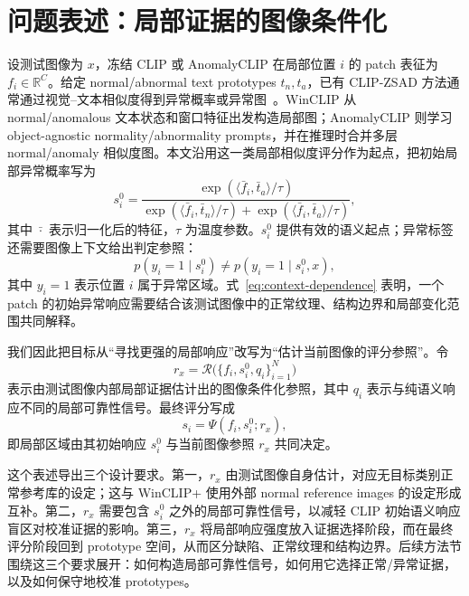 \section{问题表述：局部证据的图像条件化}

设测试图像为 $x$，冻结 CLIP 或 AnomalyCLIP 在局部位置 $i$ 的 patch 表征为 $f_i\in\mathbb{R}^{C}$。给定 normal/abnormal text prototypes $t_n,t_a$，已有 CLIP-ZSAD 方法通常通过视觉--文本相似度得到异常概率或异常图~\cite{jeong2023winclip,zhou2024anomalyclip}。WinCLIP 从 normal/anomalous 文本状态和窗口特征出发构造局部图；AnomalyCLIP 则学习 object-agnostic normality/abnormality prompts，并在推理时合并多层 normal/anomaly 相似度图。本文沿用这一类局部相似度评分作为起点，把初始局部异常概率写为
\begin{equation}
  s_i^{0}
  =
  \frac{\exp(\langle \bar f_i,\bar t_a\rangle/\tau)}
       {\exp(\langle \bar f_i,\bar t_n\rangle/\tau)+
        \exp(\langle \bar f_i,\bar t_a\rangle/\tau)},
  \label{eq:initial-score}
\end{equation}
其中 $\bar{\cdot}$ 表示归一化后的特征，$\tau$ 为温度参数。$s_i^{0}$ 提供有效的语义起点；异常标签还需要图像上下文给出判定参照：
\begin{equation}
  p(y_i=1\mid s_i^{0}) \neq p(y_i=1\mid s_i^{0}, x),
  \label{eq:context-dependence}
\end{equation}
其中 $y_i=1$ 表示位置 $i$ 属于异常区域。式~\eqref{eq:context-dependence} 表明，一个 patch 的初始异常响应需要结合该测试图像中的正常纹理、结构边界和局部变化范围共同解释。

我们因此把目标从“寻找更强的局部响应”改写为“估计当前图像的评分参照”。令
\begin{equation}
  r_x=\mathcal{R}\big(\{f_i,s_i^{0},q_i\}_{i=1}^{N}\big)
  \label{eq:image-reference}
\end{equation}
表示由测试图像内部局部证据估计出的图像条件化参照，其中 $q_i$ 表示与纯语义响应不同的局部可靠性信号。最终评分写成
\begin{equation}
  s_i = \Psi(f_i, s_i^{0}; r_x),
  \label{eq:reference-score}
\end{equation}
即局部区域由其初始响应 $s_i^0$ 与当前图像参照 $r_x$ 共同决定。

这个表述导出三个设计要求。第一，$r_x$ 由测试图像自身估计，对应无目标类别正常参考库的设定；这与 WinCLIP+ 使用外部 normal reference images 的设定形成互补。第二，$r_x$ 需要包含 $s_i^0$ 之外的局部可靠性信号，以减轻 CLIP 初始语义响应盲区对校准证据的影响。第三，$r_x$ 将局部响应强度放入证据选择阶段，而在最终评分阶段回到 prototype 空间，从而区分缺陷、正常纹理和结构边界。后续方法节围绕这三个要求展开：如何构造局部可靠性信号，如何用它选择正常/异常证据，以及如何保守地校准 prototypes。
